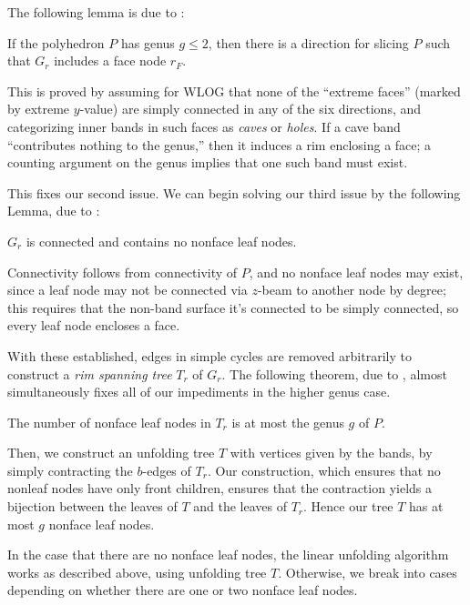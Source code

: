 \documentclass{article}
\begin{document}
The following lemma is due to \cite[Lem. 3.1.1]{Damian_Demaine}:
\begin{lemma}
  If the polyhedron $P$ has genus $g \leq 2$, then there is a direction for slicing $P$ such that $G_r$ includes a face node $r_F$.
\end{lemma}
This is proved by assuming for WLOG that none of the ``extreme faces'' (marked by extreme $y$-value) are simply connected in any of the six directions, and categorizing inner bands in such faces as \emph{caves} or \emph{holes}.
If a cave band ``contributes nothing to the genus,'' then it induces a rim enclosing a face;
a counting argument on the genus implies that one such band must exist.

This fixes our second issue.
We can begin solving our third issue by the following Lemma, due to \cite[Lem. 3.1.2]{Damian_Demaine}:
\begin{lemma}
  $G_r$ is connected and contains no nonface leaf nodes.
\end{lemma}
Connectivity follows from connectivity of $P$, and no nonface leaf nodes may exist, since a leaf node may not be connected via $z$-beam to another node by degree;
this requires that the non-band surface it's connected to be simply connected, so every leaf node encloses a face.

With these established, edges in simple cycles are removed arbitrarily to construct a \emph{rim spanning tree}  $T_r$ of $G_r$.
The following theorem, due to \cite[Thm. 3.1.1]{Damian_Demaine}, almost simultaneously fixes all of our impediments in the higher genus case.
\begin{theorem}
  The number of nonface leaf nodes in $T_r$ is at most the genus $g$ of $P$.
\end{theorem}
Then, we construct an unfolding tree $T$ with vertices given by the bands, by simply contracting the $b$-edges of $T_r$.
Our construction, which ensures that no nonleaf nodes have only front children, ensures that the contraction yields a bijection between the leaves of $T$ and the leaves of $T_r$.
Hence our tree $T$ has at most $g$ nonface leaf nodes.

In the case that there are no nonface leaf nodes, the linear unfolding algorithm works as described above, using unfolding tree $T$.
Otherwise, we break into cases depending on whether there are one or two nonface leaf nodes.
\end{document}
